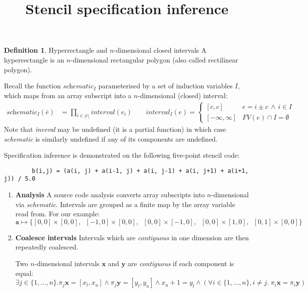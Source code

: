 \documentclass[acmlarge,review]{acmart}
\title{Stencil specification inference}
\newcommand{\vect}[1]{\textbf{#1}}
\theoremstyle{definition}
\newtheorem{defn}{Definition}
\theoremstyle{plain}
\theoremstyle{remark}
\begin{document}
\maketitle

\begin{defn}{Hyperrectangle and $n$-dimensional closed intervals}
A hyperrectangle is an $n$-dimensional rectangular polygon (also
called rectilinear polygon).
\end{defn}

\noindent
Recall the function $\textit{schematic}_I$ parameterised by
a set of induction variables $I$, which maps
from an array subscript into a $n$-dimensional (closed) interval:
%
\begin{align*}
\textit{schematic}_I(\bar{e}) & =
\prod_{i \in |\bar{e}|} \textit{interval}(e_i)
\qquad
\textit{interval}_I(e) = \begin{cases}
[c, c] & e = i \pm c \, \wedge \, i \in I \\
[-\infty, \infty] & FV(e) \cap I = \emptyset
\end{cases}
\end{align*}
Note that \textit{inveral} may be undefined (it is a partial function)
in which case \textit{schematic} is similarly undefined if any of its
components are undefined.

\noindent
Specification inference is demonstrated on the following five-point
stencil code:
%
\begin{center}
\begin{verbatim}
        b(i,j) = (a(i, j) + a(i-1, j) + a(i, j-1) + a(i, j+1) + a(i+1, j)) / 5.0
\end{verbatim}
\end{center}
%

\begin{enumerate}[leftmargin=1.5em]
\item \textbf{Analysis} A source code analysis converts array subscripts into
  $n$-dimensional via \textit{schematic}. Intervals are grouped as a
  finite map  by the array variable read from. For our example:
%
\begin{equation*}
\texttt{a} \mapsto \{[0,0]\times[0,0], \;\; [-1,0]\times[0,0], \;\;
[0,0]\times[-1,0], \;\; [0,0]\times[1,0], \;\; [0,1]\times[0,0]\}
\end{equation*}
%


\item \textbf{Coalesce intervals}
Intervals which are \emph{contiguous} in one dimension are then
repeatedly coalesced.

\begin{definition}
Two $n$-dimensional intervals $\vect{x}$ and $\vect{y}$ are
\emph{contiguous} if each component is equal:
%
\begin{equation*}
\exists j \in \{1, \ldots, n\} . \pi_j \vect{x} = [x_l, x_u] 
\wedge \pi_j \vect{y} = [y_l, y_u] 
\wedge x_u + 1 = y_l 
\wedge (\forall i \in \{1, \ldots, n\}, i \neq j . \; \pi_i \vect{x} =
\pi_i \vect{y})
\end{equation*}
%
\end{definition}

\end{enumerate}
\end{document}

